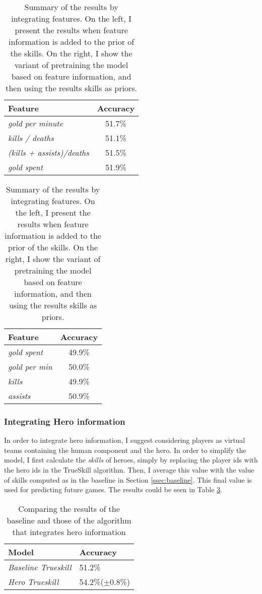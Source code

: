 \documentclass[10pt,a4]{article}
\begin{document}
\begin{table}[h!]
  \centering
  \begin{tabular}{l c}
    \textbf{Feature} & \textbf{Accuracy} \\
    \hline
    \emph{gold per minute} & 51.7\% \\ 
    \emph{kills / deaths} & 51.1\% \\
    \emph{(kills + assists)/deaths} & 51.5\% \\
    \emph{gold spent} & 51.9\% \\
    \hline
  \end{tabular}
  \quad
  \begin{tabular}{l c}
    \textbf{Feature} & \textbf{Accuracy} \\
    \hline
    \emph{gold spent} & 49.9\% \\
    \emph{gold per min} & 50.0\% \\
    \emph{kills} & 49.9\% \\
    \emph{assists} & 50.9\% \\
    \hline 
  \end{tabular}
  \caption{Summary of the results by integrating features. On the left, I present 
  the results when feature information is added to the prior of the skills. On the 
  right, I show the variant of pretraining the model based on feature information,
  and then using the results skills as priors.}
  \label{tab:features}
\end{table}

\subsubsection{Integrating Hero information}
\label{sssec:hero}
In order to integrate hero information, I suggest considering players as virtual
teams containing the human component and the hero. In order to simplify the model, 
I first calculate the \emph{skills} of heroes, simply by replacing the player ids 
with the hero ids in the TrueSkill algorithm. Then, I average this value with the 
value of skills computed as in the baseline in Section \ref{ssec:baseline}. This 
final value is used for predicting future games. The results could be seen in 
Table \ref{tab:hero}.

\begin{table}[h!]
  \centering
  \begin{tabular}{l l}
    \textbf{Model} & \textbf{Accuracy} \\
    \hline
    \emph{Baseline Trueskill} & 51.2\% \\ 
    \emph{Hero Trueskill} & 54.2\%($\pm$0.8\%) \\
    \hline
  \end{tabular}
  \caption{Comparing the results of the baseline and those of the algorithm that 
  integrates hero information}
  \label{tab:hero}
\end{table}
\end{document}
